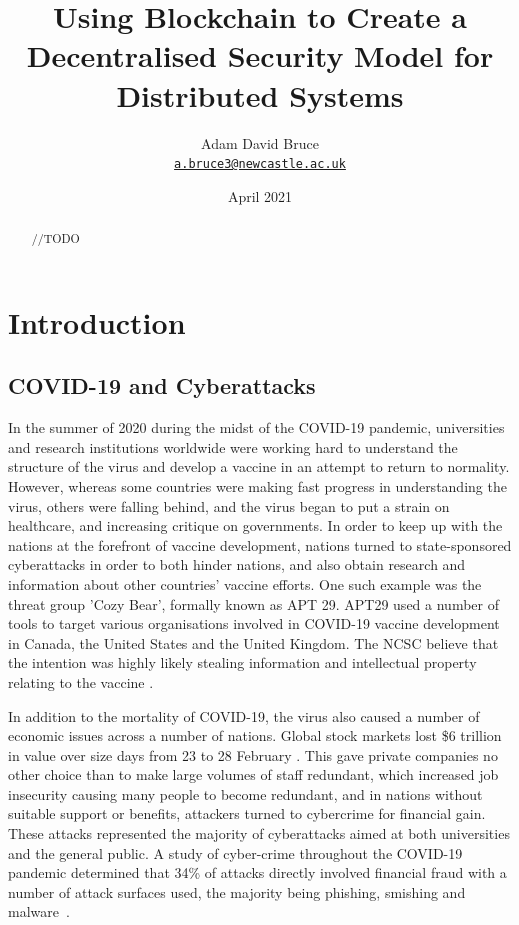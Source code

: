 \documentclass[a4paper, 11pt]{report}
\title{\Huge{\textbf{Using Blockchain to Create a Decentralised Security Model for Distributed Systems}}}
\date{April 2021}
\author{\Large{Adam David Bruce} \\ \texttt{\href{mailto:a.bruce3@newcastle.ac.uk}{a.bruce3@newcastle.ac.uk}}}
\begin{document}
\maketitle

\begin{abstract}
//TODO
\end{abstract}

\tableofcontents
\listoffigures
\listoftables

\newpage

\chapter{Introduction}
\section{COVID-19 and Cyberattacks}
In the summer of 2020 during the midst of the COVID-19 pandemic, universities and research institutions worldwide were working hard to understand the structure of the virus and develop a vaccine in an attempt to return to normality. However, whereas some countries were making fast progress in understanding the virus, others were falling behind, and the virus began to put a strain on healthcare, and increasing critique on governments. In order to keep up with the nations at the forefront of vaccine development, nations turned to state-sponsored cyberattacks in order to both hinder nations, and also obtain research and information about other countries' vaccine efforts. One such example was the threat group 'Cozy Bear', formally known as \acrfull{APT} 29. \acrshort{APT}29 used a number of tools to target various organisations involved in COVID-19 vaccine development in Canada, the United States and the United Kingdom. The \acrfull{NCSC} believe that the intention was highly likely stealing information and intellectual property relating to the vaccine \cite{APT29}.

In addition to the mortality of COVID-19, the virus also caused a number of economic issues across a number of nations. Global stock markets lost \$6 trillion in value over size days from 23 to 28 February \cite{covspill}. This gave private companies no other choice than to make large volumes of staff redundant, which increased job insecurity causing many people to become redundant, and in nations without suitable support or benefits, attackers turned to cybercrime for financial gain. These attacks represented the majority of cyberattacks aimed at both universities and the general public. A study of cyber-crime throughout the COVID-19 pandemic determined that 34\% of attacks directly involved financial fraud with a number of attack surfaces used, the majority being \gls{phishing}, \gls{smishing} and \gls{malware}~\cite{diffattack}.
\end{document}
